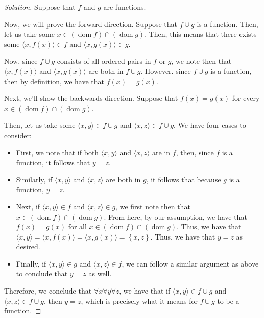 \documentclass{article}
\newenvironment{solution}{\begin{proof}[Solution]}{\end{proof}}
\renewcommand\qedsymbol{$\blacksquare$}
\newenvironment{innerproof}{\renewcommand{\qedsymbol}{$\square$}\proof}{\endproof}
\DeclareMathOperator*{\dom}{\mathrm{dom}}
\newcommand{\brc}[1]{ \left\{  {#1} \right\}}
\newcommand{\ang}[1]{\langle {#1} \rangle}
\begin{document}
	\begin{solution}
		Suppose that $f$ and $g$ are functions.
		
		Now, we will prove the forward direction.
		\begin{innerproof}
			Suppose that $f \cup g$ is a function. Then, let us take some $x \in (\dom f) \cap (\dom g)$. Then, this means that there exists some $\ang{x,f(x)} \in f$ and $\ang{x,g(x)} \in g$.
			
			Now, since $f \cup g$ consists of all ordered pairs in $f$ or $g$, we note then that $\ang{x,f(x)}$ and $\ang{x,g(x)}$ are both in $f \cup g$. However. since $f \cup g$ is a function, then by definition, we have that $f(x) = g(x)$.
		\end{innerproof}
	
		Next, we'll show the backwards direction.
		\begin{innerproof}
			Suppose that $f(x) = g(x)$ for every $x \in (\dom f) \cap (\dom g)$.
			
			Then, let us take some $\ang{x,y} \in f \cup g$ and $\ang{x,z} \in f \cup g$. We have four cases to consider:
			\begin{itemize}
				\item First, we note that if both $\ang{x,y}$ and $\ang{x,z}$ are in $f$, then, since $f$ is a function, it follows that $y = z$.
				\item Similarly, if $\ang{x,y}$ and $\ang{x,z}$ are both in $g$, it follows that because $g$ is a function, $y = z$.
				\item Next, if $\ang{x,y} \in f$ and $\ang{x,z} \in g$, we first note then that $x \in (\dom f) \cap (\dom g)$. From here, by our assumption, we have that $f(x) = g(x)$ for all $x \in (\dom f) \cap (\dom g)$. Thus, we have that $\ang{x,y} = \ang{x, f(x)} = \ang{x,g(x)} = \brc{x,z}$. Thus, we have that $y = z$ as desired.
				\item Finally, if $\ang{x,y} \in g$ and $\ang{x,z} \in f$, we can follow a similar argument as above to conclude that $y = z$ as well.
			\end{itemize}
		
			Therefore, we conclude that $\forall x \forall y \forall z$, we have that if $\ang{x,y} \in f \cup g$ and $\ang{x,z} \in f \cup g$, then $y = z$, which is precisely what it means for $f \cup g$ to be a function.
		\end{innerproof}
	\end{solution}
	
\end{document}
